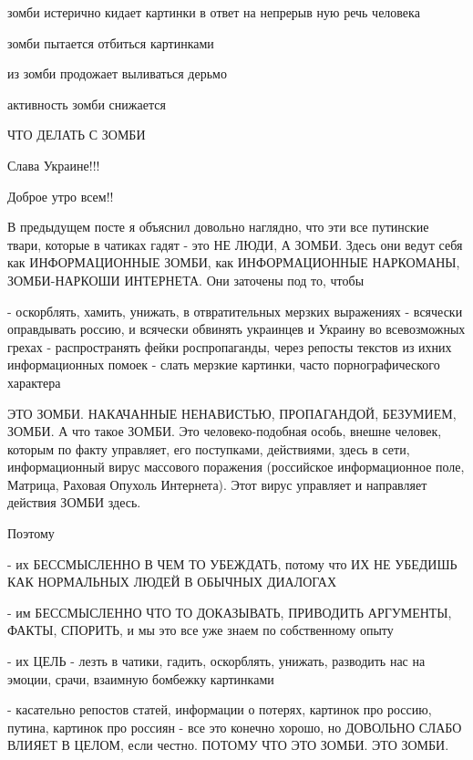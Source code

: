  
 
 
 
 

зомби 
истерично
кидает 
картинки
в ответ 
на 
непрерыв
ную
речь 
человека

зомби
пытается
отбиться
картинками

из
зомби
продожает
выливаться 
дерьмо

активность зомби снижается

ЧТО ДЕЛАТЬ С ЗОМБИ

Слава Украине!!! 💛 💙 💛 💙 💛 💙

Доброе утро всем!!

В предыдущем посте я объяснил довольно наглядно, что эти все путинские твари,
которые в чатиках гадят - это НЕ ЛЮДИ, А ЗОМБИ. Здесь они ведут себя как
ИНФОРМАЦИОННЫЕ ЗОМБИ, как ИНФОРМАЦИОННЫЕ НАРКОМАНЫ, ЗОМБИ-НАРКОШИ ИНТЕРНЕТА.
Они заточены под то, чтобы

- оскорблять, хамить, унижать, в отвратительных мерзких выражениях
- всячески оправдывать россию, и всячески обвинять украинцев и Украину
во всевозможных грехах
- распространять фейки роспропаганды, через репосты текстов из ихних информационных помоек
- слать мерзкие картинки, часто порнографического характера 

ЭТО ЗОМБИ. НАКАЧАННЫЕ НЕНАВИСТЬЮ, ПРОПАГАНДОЙ, БЕЗУМИЕМ, ЗОМБИ. А что такое
ЗОМБИ. Это человеко-подобная особь, внешне человек, которым по факту управляет,
его поступками, действиями, здесь в сети, информационный вирус массового
поражения (российское информационное поле, Матрица, Раховая Опухоль Интернета).
Этот вирус управляет и направляет действия ЗОМБИ здесь. 

Поэтому

- их БЕССМЫСЛЕННО В ЧЕМ ТО УБЕЖДАТЬ, потому что ИХ НЕ УБЕДИШЬ КАК НОРМАЛЬНЫХ
ЛЮДЕЙ В ОБЫЧНЫХ ДИАЛОГАХ

- им БЕССМЫСЛЕННО ЧТО ТО ДОКАЗЫВАТЬ, ПРИВОДИТЬ АРГУМЕНТЫ, ФАКТЫ, СПОРИТЬ, и мы
это все уже знаем по собственному опыту

- их ЦЕЛЬ - лезть в чатики, гадить, оскорблять, унижать, разводить нас на
эмоции, срачи, взаимную бомбежку картинками

- касательно репостов статей, информации о потерях, картинок про россию,
путина, картинок про россиян - все это конечно хорошо, но ДОВОЛЬНО СЛАБО ВЛИЯЕТ
В ЦЕЛОМ, если честно. ПОТОМУ ЧТО ЭТО ЗОМБИ. ЭТО ЗОМБИ.

